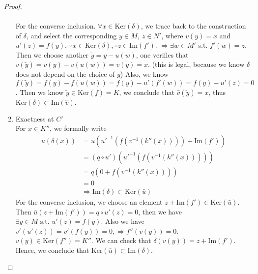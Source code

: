 \documentclass[11pt]{article}
\newcommand{\Lrta}{\Longrightarrow}
\begin{document}
\begin{proof}
\begin{enumerate}
$$\begin{aligned}
\end{aligned}
$$
For the converse inclusion. $\forall x\in \text{Ker}(\delta)$, we trace back to the construction of $\delta$, and select the corresponding $y\in M,\ z\in N'$, where $v(y)=x$ and $u'(z)=f(y)$. $\because x\in \text{Ker}(\delta),\therefore z\in \text{Im}(f')$. $\Lrta \exists w\in M'$ s.t. $f'(w)=z$. Then we choose another $\tilde{y}=y-u(w)$, one verifies that $v(\tilde{y})=v(y)-v(u(w))=v(y)=x$. (this is legal, because we know $\delta$ does not depend on the choice of $y$) Also, we know $f(\tilde{y})=f(y)-f(u(w))=f(y)-u'(f'(w))=f(y)-u'(z)=0$. Then we know $\tilde{y}\in \text{Ker}(f)=K$, we conclude that $\hat{v}(\tilde{y})=x$, thus $\text{Ker}(\delta)\subset \text{Im}(\hat{v})$.
\item Exactness at $C'$\\
For $x\in K''$, we formally write
$$
\begin{aligned}
\bar{u}(\delta(x))&=\bar{u}\left(u'^{-1}(f(v^{-1}(k''(x))))+\text{Im}(f')\right)\\
&=(q\circ u')\left(u'^{-1}(f(v^{-1}(k''(x))))\right)\\
&=q(0+f(v^{-1}(k''(x))))\\
&=0\\
&\Lrta \text{Im}(\delta)\subset \text{Ker}(\bar{u})
\end{aligned}
$$
For the converse inclusion, we choose an element $z+\text{Im}(f')\in \text{Ker}(\bar{u})$. Then $\bar{u}(z+\text{Im}(f'))=q\circ u'(z)=0$, then we have $\exists y\in M \text{ s.t. } u'(z)=f(y)$. Also we have $v'(u'(z))=v'(f(y))=0,\Lrta f''(v(y))=0$. $v(y)\in \text{Ker}(f'')=K''$. We can check that $\delta(v(y))=z+\text{Im}(f')$. Hence, we conclude that $\text{Ker}(\bar{u})\subset \text{Im}(\delta)$.
\end{enumerate}
\end{proof}
\end{document}
